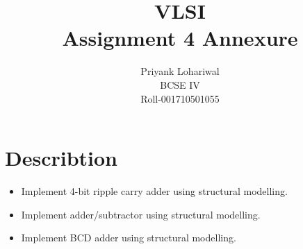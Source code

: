 \documentclass[titlepage]{article}
\title{VLSI \\Assignment 4 Annexure}
\author{Priyank Lohariwal\\BCSE IV\\Roll-001710501055}
\date{}
\begin{document}
    {\maketitle}

    \section{Describtion}
    \begin{itemize}
        \item Implement 4-bit ripple carry adder using structural modelling.
        \item Implement adder/subtractor using structural modelling.
        \item Implement BCD adder using structural modelling.
    \end{itemize}
\end{document}
